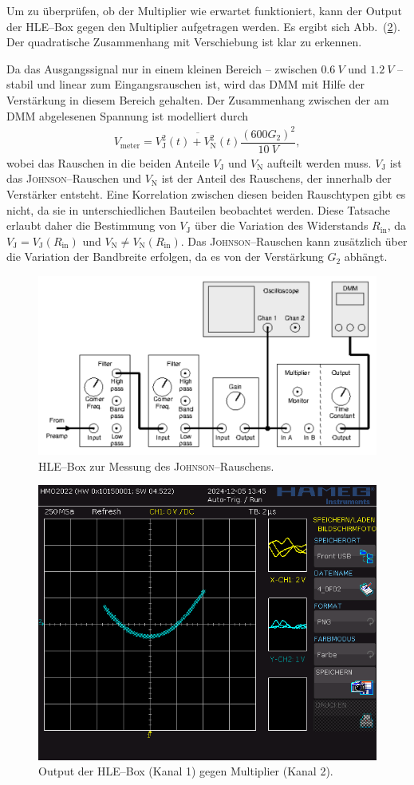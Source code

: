 \documentclass[sn-mathphys-num,iicol]{sn-jnl}
\theoremstyle{thmstyleone}
\theoremstyle{thmstyletwo}
\theoremstyle{thmstylethree}
\begin{document}
Um zu überprüfen, ob der Multiplier wie erwartet funktioniert, kann der Output der HLE--Box gegen den Multiplier aufgetragen werden.
Es ergibt sich Abb.\ (\ref{fig:multiplier}).
Der quadratische Zusammenhang mit Verschiebung ist klar zu erkennen.

Da das Ausgangssignal nur in einem kleinen Bereich -- zwischen $\SI{0.6}{V}$ und $\SI{1.2}{V}$ -- stabil und linear zum Eingangsrauschen ist, wird das DMM mit Hilfe der Verstärkung in diesem Bereich gehalten.
Der Zusammenhang zwischen der am DMM abgelesenen Spannung ist modelliert durch
\begin{align} 
        V_\text{meter}=\overline{V_\text{J}^2(t)+V_\text{N}^2(t)}\dfrac{\left(600G_2\right)^2}{\SI{10}{V}}
,\end{align} 
wobei das Rauschen in die beiden Anteile $V_\text{J}$ und $V_\text{N}$ aufteilt werden muss.
$V_\text{J}$ ist das \textsc{Johnson}--Rauschen und $V_\text{N}$ ist der Anteil des Rauschens, der innerhalb der Verstärker entsteht.
Eine Korrelation zwischen diesen beiden Rauschtypen gibt es nicht, da sie in unterschiedlichen Bauteilen beobachtet werden.
Diese Tatsache erlaubt daher die Bestimmung von $V_\text{J}$ über die Variation des Widerstands $R_\text{in}$, da $V_\text{J}=V_\text{J}(R_\text{in})$ und $V_\text{N}\neq V_\text{N}(R_\text{in})$.
Das \textsc{Johnson}--Rauschen kann zusätzlich über die Variation der Bandbreite erfolgen, da es von der Verstärkung $G_2$ abhängt.

\begin{figure}[t]
        \centering
        \includegraphics[width=.5\textwidth]{425_schaltplan_messung_johnson.png}
        \caption{HLE--Box zur Messung des \textsc{Johnson}--Rauschens.\cite{anleitung425}} \label{fig:johnson_hle_messung}
\end{figure}

\begin{figure}[t]
        \centering
        \includegraphics[width=.5\textwidth]{../data/4_0F02.png}
        \caption{Output der HLE--Box (Kanal 1) gegen Multiplier (Kanal 2).} \label{fig:multiplier}
\end{figure}
\end{document}
